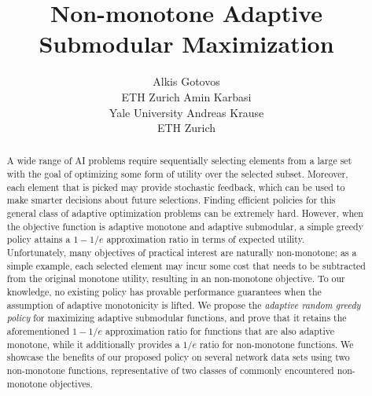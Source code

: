 \documentclass{article}
\title{Non-monotone Adaptive Submodular Maximization}
\author{Alkis Gotovos\\
ETH Zurich
\And
Amin Karbasi\\
Yale University
\And
Andreas Krause\\
ETH Zurich}
\begin{document}
\maketitle

\begin{abstract}
A wide range of AI problems require sequentially selecting elements from a large set with the goal of optimizing some form of utility over the selected subset.
Moreover, each element that is picked may provide stochastic feedback, which can be used to make smarter decisions about future selections.
Finding efficient policies for this general class of adaptive optimization problems can be extremely hard.
However, when the objective function is adaptive monotone and adaptive submodular, a simple greedy policy attains a $1-1/e$ approximation ratio in terms of expected utility.
Unfortunately, many objectives of practical interest are naturally non-monotone; as a simple example, each selected element may incur some cost that needs to be subtracted from the original monotone utility, resulting in an non-monotone objective.
To our knowledge, no existing policy has provable performance guarantees when the assumption of adaptive monotonicity is lifted.
We propose the \emph{adaptive random greedy policy} for maximizing adaptive submodular functions, and prove that it retains the aforementioned $1-1/e$ approximation ratio for functions that are also adaptive monotone, while it additionally provides a $1/e$ ratio for non-monotone functions.
We showcase the benefits of our proposed policy on several network data sets using two non-monotone functions, representative of two classes of commonly encountered non-monotone objectives.
\end{abstract}
\end{document}

